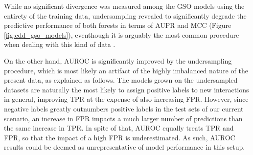 \documentclass[conference]{IEEEtran}
\begin{document}
While no significant divergence was measured among the GSO models using the entirety of the training data, undersampling revealed to significantly degrade the predictive performance of both forests in terms of AUPR and MCC (Figure \ref{fig:cdd_gso_models}), eventhough it is arguably the most common procedure when dealing with this kind of data \cite{}.

On the other hand, AUROC is significantly improved by the undersampling procedure, which is most likely an artifact of the highly imbalanced nature of the present data, as explained as follows. The models grown on the undersampled datasets are naturally the most likely to assign positive labels to new interactions in general, improving TPR at the expense of also increasing FPR. However, since negative labels greatly outnumbers positive labels in the test sets of our current scenario, an increase in FPR impacts a much larger number of predictions than the same increase in TPR. In spite of that, AUROC equally treats TPR and FPR, so that the impact of a high FPR is underestimated. As such, AUROC results could be deemed as unrepresentative of model performance in this setup.
\end{document}
